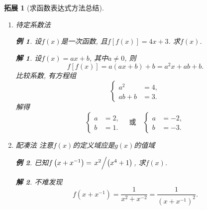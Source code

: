 \documentclass[a4paper, 12pt]{ctexart}
\theoremstyle{plain}
\theoremstyle{nonumberplain}
\newtheorem{solution}{解}
\theoremstyle{nonumberplain}
\newtheorem{supplement}{拓展}
\theoremstyle{nonumberplain}
\newtheorem{example}{例}
\begin{document}
    \begin{supplement}[求函数表达式方法总结]\hspace{\fill}
        \begin{enumerate}[1.]
            \item 待定系数法
            \begin{example}
                设$f(x)$是一次函数, 且$f[f(x)]=4x+3$. 求$f(x)$.
            \end{example}
            \begin{solution}
                设$f(x)=ax+b$, 其中$a\neq 0$, 则
                \begin{equation}
                    f[f(x)]=a(ax+b)+b=a^2x+ab+b.
                \end{equation}
                比较系数, 有方程组
                \begin{equation}
                    \left\{\begin{aligned}
                        a^2&=4,\\
                        ab+b&=3.
                    \end{aligned}\right.
                \end{equation}
                解得
                \begin{equation}
                    \left\{\begin{aligned}
                        a&=2,\\
                        b&=1.
                    \end{aligned}\right.
                    \quad\text{或}\quad
                    \left\{\begin{aligned}
                        a&=-2,\\
                        b&=-3.
                    \end{aligned}\right.
                \end{equation}
            \end{solution}
            \item 配凑法 \emph{注意$f(x)$的定义域应是$g(x)$的值域}
            \begin{example}
                已知$f\left(x+x^{-1}\right)=\left.x^2\middle/\left(x^4+1\right)\right.$, 求$f(x)$.
            \end{example}
            \begin{solution}
                不难发现
                \begin{equation}
                    f\left(x+x^{-1}\right)=\frac{1}{x^2+x^{-2}}=\frac{1}{\left(x+x^{-1}\right)^2}.

\end{equation}
\end{solution}
\end{enumerate}
\end{supplement}
\end{document}
